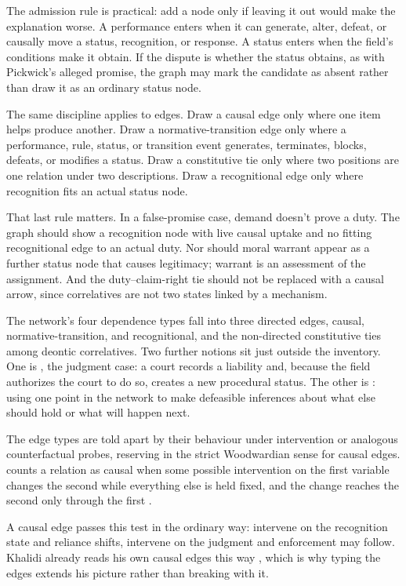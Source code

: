 \documentclass[12pt]{article}
\begin{document}
The admission rule is practical: add a node only if leaving it out would make the explanation worse. A performance enters when it can generate, alter, defeat, or causally move a status, recognition, or response. A status enters when the field's conditions make it obtain. If the dispute is whether the status obtains, as with Pickwick's alleged promise, the graph may mark the candidate as absent rather than draw it as an ordinary status node.

The same discipline applies to edges. Draw a causal edge only where one item helps produce another. Draw a normative-transition edge only where a performance, rule, status, or transition event generates, terminates, blocks, defeats, or modifies a status. Draw a constitutive tie only where two positions are one relation under two descriptions. Draw a recognitional edge only where recognition fits an actual status node.

That last rule matters. In a false-promise case, demand doesn't prove a duty. The graph should show a recognition node with live causal uptake and no fitting recognitional edge to an actual duty. Nor should moral warrant appear as a further status node that causes legitimacy; warrant is an assessment of the assignment. And the duty--claim-right tie should not be replaced with a causal arrow, since correlatives are not two states linked by a mechanism.

The network's four dependence types fall into three directed edges, causal, normative-transition, and recognitional, and the non-directed constitutive ties among deontic correlatives. Two further notions sit just outside the inventory. One is , the judgment case: a court records a liability and, because the field authorizes the court to do so, creates a new procedural status. The other is : using one point in the network to make defeasible inferences about what else should hold or what will happen next.

The edge types are told apart by their behaviour under intervention or analogous counterfactual probes, reserving  in the strict Woodwardian sense for causal edges. \textcite{woodward2003MakingThingsHappen} counts a relation as causal when some possible intervention on the first variable changes the second while everything else is held fixed, and the change reaches the second only through the first \citep{woodward2014MethodologyOntology}.

A causal edge passes this test in the ordinary way: intervene on the recognition state and reliance shifts, intervene on the judgment and enforcement may follow. Khalidi already reads his own causal edges this way \citep{khalidi2018nodes}, which is why typing the edges extends his picture rather than breaking with it.
\end{document}
